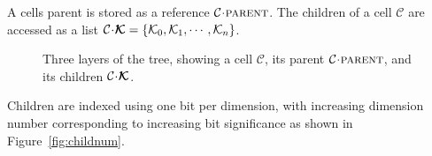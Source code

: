 \documentclass[twoside]{IIBproject}
\newcommand{\vect} [1] {\bm{#1}}
\newcommand{\acc}{{\mkern 0.5mu\cdot\mkern 0.5mu}}
\numberwithin{figure}{section}
\begin{document}
            A cells parent is stored as a reference $\mathcal{C}\acc\textproc{parent}$. The children of a cell $\mathcal{C}$ are accessed as a list $\mathcal{C}\acc\vect{\mathcal{K}}=\{\mathcal{K}_0,\mathcal{K}_1,\cdots,\mathcal{K}_n\}$.

            \begin{figure}[H]
                \centering
                
                \caption{Three layers of the tree, showing a cell $\mathcal{C}$, its parent $\mathcal{C}\acc\textproc{parent}$, and its children $\mathcal{C}\acc\vect{\mathcal{K}}$.}
                \label{fig:ftt-layerlinks}
            \end{figure}

            Children are indexed using one bit per dimension, with increasing dimension number corresponding to increasing bit significance as shown in Figure~\ref{fig:childnum}.
\end{document}
